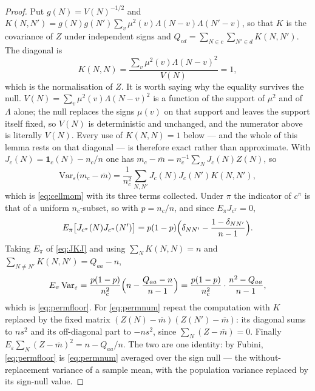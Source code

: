 \documentclass[11pt,a4paper]{article}
\theoremstyle{plain}
\theoremstyle{definition}
\theoremstyle{remark}
\begin{document}
\begin{proof}
Put $g(N)=V(N)^{-1/2}$ and
$K(N,N')=g(N)g(N')\sum_v\mu^2(v)\Lambda(N-v)\Lambda(N'-v)$, so that
$K$ is the covariance of $Z$ under independent signs and
$Q_{cd}=\sum_{N\in c}\sum_{N'\in d}K(N,N')$. The diagonal is
\[
  K(N,N)=\frac{\sum_v\mu^2(v)\Lambda(N-v)^2}{V(N)}=1,
\]
which is the normalisation of $Z$. It is worth saying why the equality
survives the null. $V(N)=\sum_v\mu^2(v)\Lambda(N-v)^2$ is a function of
the support of $\mu^2$ and of $\Lambda$ alone; the null replaces the
signs $\mu(v)$ on that support and leaves the support itself fixed, so
$V(N)$ is deterministic and unchanged, and the numerator above is
literally $V(N)$. Every use of $K(N,N)=1$ below --- and the whole of
this lemma rests on that diagonal --- is therefore exact rather than
approximate. With
$J_c(N)=\mathbf 1_c(N)-n_c/n$ one has
$m_c-\overline m=n_c^{-1}\sum_NJ_c(N)Z(N)$, so
\begin{equation}\label{eq:JKJ}
  \mathrm{Var}_\varepsilon\bigl(m_c-\overline m\bigr)
  =\frac1{n_c^2}\sum_{N,N'}J_c(N)J_c(N')K(N,N'),
\end{equation}
which is \eqref{eq:cellmom} with its three terms collected. Under
$\pi$ the indicator of $c^\pi$ is that of a uniform $n_c$-subset, so
with $p=n_c/n$, and since $E_\pi J_{c^\pi}=0$,
\[
  E_\pi\bigl[J_{c^\pi}(N)J_{c^\pi}(N')\bigr]
  =p(1-p)\Bigl(\delta_{NN'}-\frac{1-\delta_{NN'}}{n-1}\Bigr).
\]
Taking $E_\pi$ of \eqref{eq:JKJ} and using $\sum_NK(N,N)=n$ and
$\sum_{N\neq N'}K(N,N')=Q_{aa}-n$,
\[
  E_\pi\,\mathrm{Var}_\varepsilon
  =\frac{p(1-p)}{n_c^2}\Bigl(n-\frac{Q_{aa}-n}{n-1}\Bigr)
  =\frac{p(1-p)}{n_c^2}\cdot\frac{n^2-Q_{aa}}{n-1},
\]
which is \eqref{eq:permfloor}. For \eqref{eq:permnum} repeat the
computation with $K$ replaced by the fixed matrix
$(Z(N)-\overline m)(Z(N')-\overline m)$: its diagonal sums to $ns^2$
and its off-diagonal part to $-ns^2$, since $\sum_N(Z-\overline m)=0$.
Finally
$E_\varepsilon\sum_N(Z-\overline m)^2=n-Q_{aa}/n$. The two are one
identity: by Fubini, \eqref{eq:permfloor} is \eqref{eq:permnum}
averaged over the sign null --- the without-replacement variance of a
sample mean, with the population variance replaced by its sign-null
value.
\end{proof}
\end{document}
